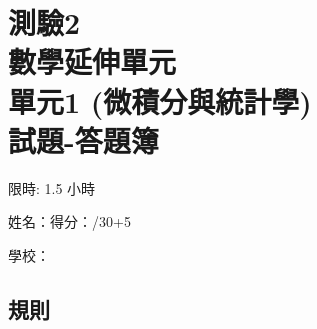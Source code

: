 \documentclass[12pt]{article}
\begin{document}
    \thispagestyle{empty}

    \centering 

    \section*{測驗2\\數學延伸單元\\單元1 (微積分與統計學)\\試題-答題簿}

    限時: 1.5 小時

    姓名：\hrulefill \hfill 得分：\hrulefill/30+5

    學校：\hrulefill

    \raggedright

    \subsection*{規則}
\end{document}
